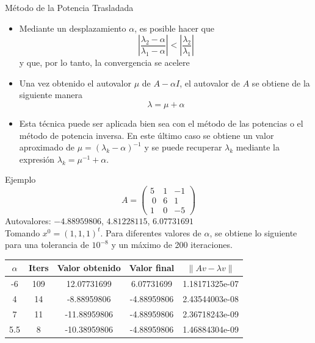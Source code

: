 \documentclass[11pt]{beamer}
\begin{document}
  \begin{frame}{M\'etodo de la Potencia Trasladada}
    \begin{itemize}
      \item Mediante un desplazamiento $\alpha$, es posible hacer que 
      $$
      \left|\dfrac{\lambda_2-\alpha}{\lambda_1-\alpha}\right|<\left|\dfrac{\lambda_2}{\lambda_1}\right|
      $$
      y que, por lo tanto, la convergencia se acelere
      \item<2-> Una vez obtenido el autovalor $\mu$ de $A-\alpha I$, el autovalor de $A$ se obtiene de la siguiente manera
      $$
      \lambda = \mu + \alpha
      $$
      \item<3->Esta t\'ecnica puede ser aplicada bien sea con el m\'etodo de las potencias o el m\'etodo de potencia inversa. En este \'ultimo caso se obtiene un valor aproximado de $\mu=(\lambda_k - \alpha)^{-1}$ y se puede recuperar $\lambda_k$ mediante la expresi\'on $\lambda_k = \mu^{-1}+\alpha$.
      \end{itemize}
    \end{frame}
  \begin{frame}{Ejemplo}
  $$
A=\left(\begin{array}{ccc}
  5 & 1 & -1\\\
  0 & 6 & 1\\
  1 & 0 & -5\end{array}\right)
  $$
  Autovalores: $-4.88959806$, $4.81228115$, $6.07731691$\\
  Tomando $x^0=(1,1,1)^t$. Para diferentes valores de $\alpha$, se obtiene lo siguiente para una tolerancia de $10^{-8}$ y un m\'aximo de 200 iteraciones.
  \begin{center}
    \begin{tabular}{|c|c|c|c|c|}\hline
      $\alpha$ & Iters & Valor obtenido & Valor final & $\|Av-\lambda v\|$\\\hline
      -6 & 109 & 12.07731699 & 6.07731699 &   1.18171325e-07\\\hline
      4 & 14 &  -8.88959806 & -4.88959806 & 2.43544003e-08\\\hline
      7 &  11 & -11.88959806 & -4.88959806 & 2.36718243e-09\\\hline
      5.5 & 8 & -10.38959806 & -4.88959806 & 1.46884304e-09\\\hline
    \end{tabular}
  \end{center}
  \end{frame}
\end{document}
